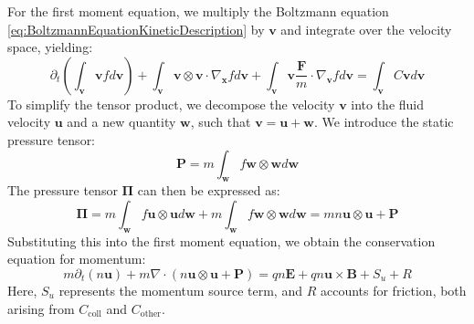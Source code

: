 For the first moment equation, we multiply the Boltzmann equation \ref{eq:BoltzmannEquationKineticDescription} by $\mathbf{v}$ and integrate over the velocity space, yielding:
\begin{equation}
	\partial_t \left( \int_\mathbf{v} \mathbf{v} f d\mathbf{v} \right) + \int_\mathbf{v} \mathbf{v} \otimes \mathbf{v} \cdot \nabla_{\mathbf{x}} f d\mathbf{v} + \int_\mathbf{v} \mathbf{v} \frac{\mathbf{F}}{m} \cdot \nabla_{\mathbf{v}} f d\mathbf{v} = \int_\mathbf{v} C \mathbf{v} d\mathbf{v}
\end{equation}
To simplify the tensor product, we decompose the velocity $\mathbf{v}$ into the fluid velocity $\mathbf{u}$ and a new quantity $\mathbf{w}$, such that $\mathbf{v} = \mathbf{u} + \mathbf{w}$. We introduce the static pressure tensor:
\begin{equation}
	\boldsymbol{P} = m \int_\mathbf{w} f \mathbf{w} \otimes \mathbf{w} d\mathbf{w}
\end{equation}
The pressure tensor $\boldsymbol{\Pi}$ can then be expressed as:
\begin{equation}
	\boldsymbol{\Pi} = m \int_\mathbf{w} f \mathbf{u} \otimes \mathbf{u} d\mathbf{w} + m \int_\mathbf{w} f \mathbf{w} \otimes \mathbf{w} d\mathbf{w} = mn \mathbf{u} \otimes \mathbf{u} + \boldsymbol{P}
\end{equation}
Substituting this into the first moment equation, we obtain the conservation equation for momentum:
\begin{equation}
	\label{eq:FirstMomentTransportEquation}
	m \partial_t (n \mathbf{u}) + m \nabla \cdot \left( n \mathbf{u} \otimes \mathbf{u} + \boldsymbol{P} \right) = qn \mathbf{E} + qn \mathbf{u} \times \mathbf{B} + S_u + R
\end{equation}
Here, $S_u$ represents the momentum source term, and $R$ accounts for friction, both arising from $C_{\text{coll}}$ and $C_{\text{other}}$.

